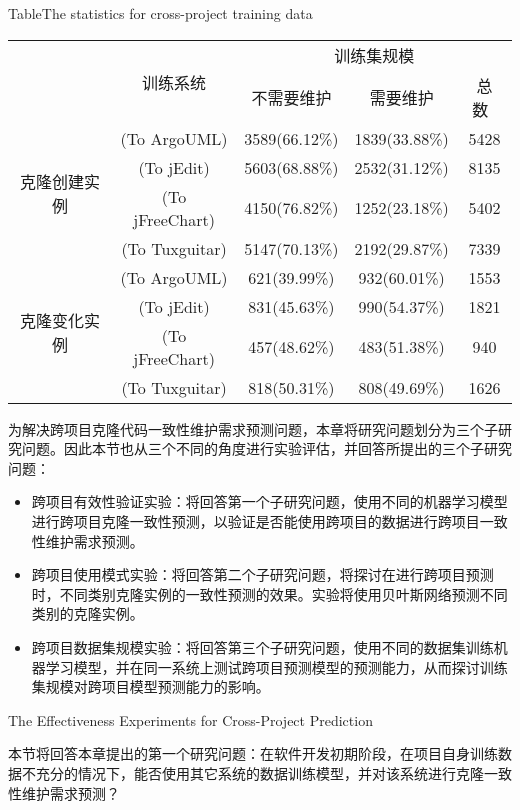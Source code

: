 \begin{table}[h]
{Table$\!$}{The statistics for cross-project training data}
\vspace{0.5em}
\centering
\wuhao
\begin{tabular}{ccccc}
\toprule[1.5pt]
~\multirow{2}{*}{类型}&\multirow{2}{*}{训练系统}&\multicolumn{3}{c}{训练集规模}\\
~&~&{不需要维护}&{需要维护}&{总数}~\\
\midrule[1pt]
\multirow{4}{*}{克隆创建实例}
&(To ArgoUML)&3589(66.12\%)&1839(33.88\%)&5428\\
&(To jEdit)&5603(68.88\%)&2532(31.12\%)&8135\\
&(To jFreeChart)&4150(76.82\%)&1252(23.18\%)&5402\\
&(To Tuxguitar)&	5147(70.13\%)&2192(29.87\%)&	7339\\
\multirow{4}{*}{克隆变化实例}
&(To ArgoUML)&621(39.99\%)&932(60.01\%)&1553\\
&(To jEdit)&831(45.63\%)&990(54.37\%)&1821\\
&(To jFreeChart)&457(48.62\%)&483(51.38\%)&940\\
&(To Tuxguitar)&	818(50.31\%)&808(49.69\%)&1626\\
\bottomrule[1.5pt]
\end{tabular}
\end{table}

为解决跨项目克隆代码一致性维护需求预测问题，本章将研究问题划分为三个子研究问题。因此本节也从三个不同的角度进行实验评估，并回答所提出的三个子研究问题：
\begin{itemize}
\item
跨项目有效性验证实验：将回答第一个子研究问题，使用不同的机器学习模型进行跨项目克隆一致性预测，以验证是否能使用跨项目的数据进行跨项目一致性维护需求预测。
\item
跨项目使用模式实验：将回答第二个子研究问题，将探讨在进行跨项目预测时，不同类别克隆实例的一致性预测的效果。实验将使用贝叶斯网络预测不同类别的克隆实例。
\item
跨项目数据集规模实验：将回答第三个子研究问题，使用不同的数据集训练机器学习模型，并在同一系统上测试跨项目预测模型的预测能力，从而探讨训练集规模对跨项目模型预测能力的影响。
\end{itemize}

{The Effectiveness Experiments for Cross-Project Prediction}

本节将回答本章提出的第一个研究问题：在软件开发初期阶段，在项目自身训练数据不充分的情况下，能否使用其它系统的数据训练模型，并对该系统进行克隆一致性维护需求预测？

